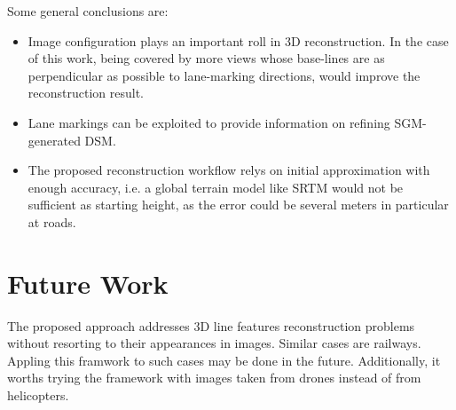 

Some general conclusions are:
\begin{itemize}
	\item Image configuration plays an important roll in 3D reconstruction. In the case of this work, being covered by more views whose base-lines are as perpendicular as possible to lane-marking directions, would improve the reconstruction result.
	
	\item Lane markings can be exploited to provide information on refining SGM-generated DSM.%

	\item The proposed reconstruction workflow relys on initial approximation with enough accuracy, i.e. a global terrain model like SRTM would not be sufficient as starting height, as the error could be several meters in particular at roads.
\end{itemize}





\section*{Future Work}
\label{chap:futurework}



The proposed approach addresses 3D line features reconstruction problems without resorting to their appearances in images. Similar cases are railways. Appling this framwork to such cases may be done in the future. Additionally, it worths trying the framework with images taken from drones instead of from helicopters.

